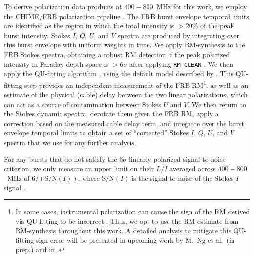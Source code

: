 \documentclass[twocolumn, linenumbers]{aastex701}
\newcommand{\fixme}[1]{{\color{red}#1}}
\begin{document}
To derive polarization data products at $400-800$~MHz for this work, we employ the CHIME/FRB polarization pipeline \citep[for details, see][]{2021ApJ...920..138M, 2024ApJ...968...50P}. The FRB burst envelope temporal limits are identified as the region in which the total intensity is $>20$\% of the peak burst intensity. Stokes $I$, $Q$, $U$, and $V$ spectra are produced by integrating over this burst envelope with uniform weights in time. We apply RM-synthesis \citep{2005A&A...441.1217B} to the FRB Stokes spectra, obtaining a robust RM detection if the peak polarized intensity in Faraday depth space is $>6\sigma$ after applying {\tt RM-CLEAN} \citep{2009A&A...503..409H}. We then apply the QU-fitting algorithm \citep[implemented with a modified version of V1.2 of the {\tt RM-tools} package;][]{2020ascl.soft05003P, 2026arXiv260120092V}, using the default model described by \cite{2021ApJ...920..138M}. This QU-fitting step provides an independent measurement of the FRB RM\footnote{In some cases, instrumental polarization can cause the sign of the RM derived via QU-fitting to be incorrect \citep[see Appendix A by][]{2021ApJ...920..138M}. Thus, we opt to use the RM estimate from RM-synthesis throughout this work. A detailed analysis to mitigate this QU-fitting sign error will be presented in upcoming work by M.~Ng et al.~(in prep.) and in \fixme{\citet{2024ApJ...964..131S}}.}. as well as an estimate of the physical (cable) delay between the two linear polarizations, which can act as a source of contamination between Stokes $U$ and $V$. We then return to the Stokes dynamic spectra, derotate them given the FRB RM, apply a correction based on the measured cable delay term, and integrate over the burst envelope temporal limits to obtain a set of ``corrected'' Stokes $I$, $Q$, $U$, and $V$ spectra that we use for any further analysis.

For any bursts that do not satisfy the $6\sigma$ linearly polarized signal-to-noise criterion, we only measure an upper limit on their $L/I$ averaged across $400-800$~MHz of $6/(\mathrm{S/N}(I))$, where $\mathrm{S/N}(I)$ is the signal-to-noise of the Stokes $I$ signal \citep{2024ApJ...968...50P}.
\end{document}
